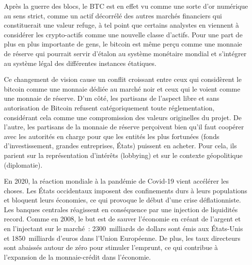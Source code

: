 Après la guerre des blocs, le BTC est en effet vu comme une sorte d'or numérique au sens strict, comme un actif décorrélé des autres marchés financiers qui constituerait une valeur refuge, à tel point que certains analystes en viennent à considérer les crypto-actifs comme une nouvelle classe d'actifs. Pour une part de plus en plus importante de gens, le bitcoin est même perçu comme une monnaie de réserve qui pourrait servir d'étalon au système monétaire mondial et s'intégrer au système légal des différentes instances étatiques.

Ce changement de vision cause un conflit croissant entre ceux qui considèrent le bitcoin comme une monnaie dédiée au marché noir et ceux qui le voient comme une monnaie de réserve. D'un côté, les partisans de l'aspect libre et sans autorisation de Bitcoin refusent catégoriquement toute réglementation, considérant cela comme une compromission des valeurs originelles du projet. De l'autre, les partisans de la monnaie de réserve perçoivent bien qu'il faut coopérer avec les autorités en charge pour que les entités les plus fortunées (fonds d'investissement, grandes entreprises, États) puissent en acheter. Pour cela, ils parient sur la représentation d'intérêts (lobbying) et sur le contexte géopolitique (diplomatie).

En 2020, la réaction mondiale à la pandémie de Covid-19 vient accélérer les choses. Les États occidentaux imposent des confinements durs à leurs populations et bloquent leurs économies, ce qui provoque le début d'une crise déflationniste. Les banques centrales réagissent en conséquence par une injection de liquidités record. Comme en 2008, le but est de sauver l'économie en créant de l'argent et en l'injectant sur le marché~: 2300~milliards de dollars sont émis aux États-Unis et 1850~milliards d'euros dans l'Union Européenne. De plus, les taux directeurs sont abaissés autour de zéro pour stimuler l'emprunt, ce qui contribue à l'expansion de la monnaie-crédit dans l'économie.

